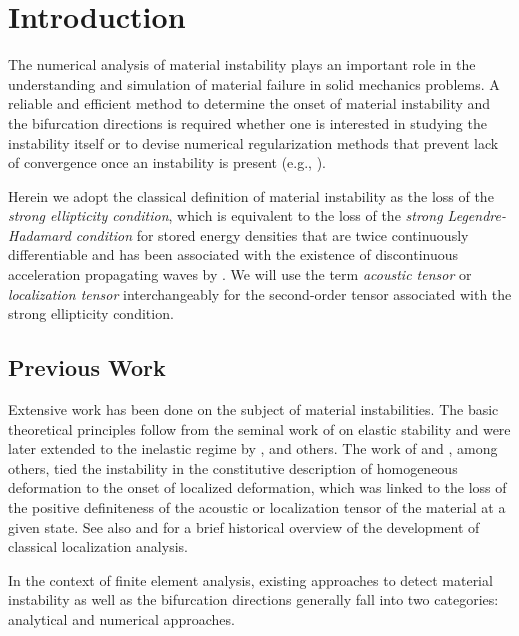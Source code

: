 \documentclass[12pt]{article}
\numberwithin{equation}{section}
\begin{document}
\section{Introduction}
\label{sec:intro}

The numerical analysis of material instability plays an important role
in the understanding and simulation of material failure in solid
mechanics problems. A reliable and efficient method to determine the
onset of material instability and the bifurcation directions is
required whether one is interested in studying the instability itself
or to devise numerical regularization methods that prevent lack of
convergence once an instability is present (e.g.,
\cite{Simo.etal:1993, Oliver:1996a, Oliver:1996b,
  Armero.Garikipati:1996, Moes.Belytschko:2002, Foster.etal:2007,
  Chen.etal:2011}).

Herein we adopt the classical definition of material instability as
the loss of the \emph{strong ellipticity condition}, which is
equivalent to the loss of the \emph{strong Legendre-Hadamard
  condition} for stored energy densities that are twice continuously
differentiable \citep{Antman:2005} and has been associated with the
existence of discontinuous acceleration propagating waves by
\citet{Hill:1962}. We will use the term \emph{acoustic tensor} or
\emph{localization tensor} interchangeably for the second-order tensor
associated with the strong ellipticity condition.

\subsection{Previous Work}

Extensive work has been done on the subject of material instabilities.
The basic theoretical principles follow from the seminal work of
\citet{Hadamard:1903} on elastic stability and were later extended to
the inelastic regime by \citet{Thomas:1961}, \citet{Hill:1962} and
others. The work of \citet{Rice:1976} and \citet{Rudnicki.Riche:1975},
among others, tied the instability in the constitutive description of
homogeneous deformation to the onset of localized deformation, which
was linked to the loss of the positive definiteness of the acoustic or
localization tensor of the material at a given state. See also
\citet*{Armero.Garikipati:1996} and \citet*{Miehe.etal:2004} for a
brief historical overview of the development of classical localization
analysis.

In the context of finite element analysis, existing approaches to
detect material instability as well as the bifurcation directions
generally fall into two categories: analytical and numerical
approaches.
\end{document}
